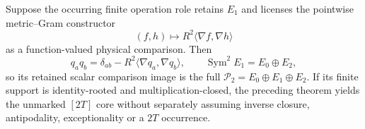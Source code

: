 \documentclass[12pt,a4paper]{article}
\begin{document}
\begin{corollary}
\label{p2a:cor:v236-native-qop2}
Suppose the occurring finite operation role retains \(E_1\) and licenses the
pointwise metric--Gram constructor
\[
 (f,h)\longmapsto R^2\langle\nabla f,\nabla h\rangle
\]
as a function-valued physical comparison.  Then
\[
 q_aq_b=\delta_{ab}-R^2\langle\nabla q_a,\nabla q_b\rangle,
 \qquad
 \operatorname{Sym}^2E_1=E_0\oplus E_2,
\]
so its retained scalar comparison image is the full
\(\mathcal P_2=E_0\oplus E_1\oplus E_2\).  If its finite support is
identity-rooted and multiplication-closed, the preceding theorem yields the
unmarked \([2T]\) core without separately assuming inverse closure,
antipodality, exceptionality or a \(2T\) occurrence.
\end{corollary}
\end{document}
